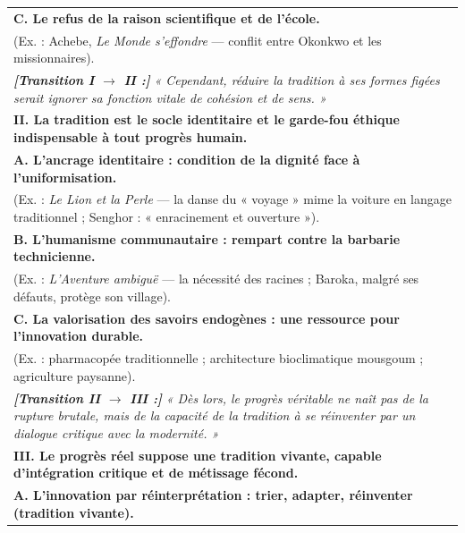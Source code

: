 \documentclass[11pt]{article}
\begin{document}
\begin{exoresolu}
\begin{center}
\begin{tabularx}{\linewidth}{|X|}
\hspace{0.5cm} \textbf{C. Le refus de la raison scientifique et de l'école.} \\
\hspace{1cm} (Ex. : Achebe, \emph{Le Monde s'effondre} — conflit entre Okonkwo et les missionnaires). \\
\hspace{0.5cm} \textit{\textbf{[Transition I $\rightarrow$ II :]}} \emph{« Cependant, réduire la tradition à ses formes figées serait ignorer sa fonction vitale de cohésion et de sens. »} \\ \hline
\textbf{II. La tradition est le socle identitaire et le garde-fou éthique indispensable à tout progrès humain.} \\
\hspace{0.5cm} \textbf{A. L'ancrage identitaire : condition de la dignité face à l'uniformisation.} \\
\hspace{1cm} (Ex. : \emph{Le Lion et la Perle} — la danse du « voyage » mime la voiture en langage traditionnel ; Senghor : « enracinement et ouverture »). \\
\hspace{0.5cm} \textbf{B. L'humanisme communautaire : rempart contre la barbarie technicienne.} \\
\hspace{1cm} (Ex. : \emph{L'Aventure ambiguë} — la nécessité des racines ; Baroka, malgré ses défauts, protège son village). \\
\hspace{0.5cm} \textbf{C. La valorisation des savoirs endogènes : une ressource pour l'innovation durable.} \\
\hspace{1cm} (Ex. : pharmacopée traditionnelle ; architecture bioclimatique mousgoum ; agriculture paysanne). \\
\hspace{0.5cm} \textit{\textbf{[Transition II $\rightarrow$ III :]}} \emph{« Dès lors, le progrès véritable ne naît pas de la rupture brutale, mais de la capacité de la tradition à se réinventer par un dialogue critique avec la modernité. »} \\ \hline
\textbf{III. Le progrès réel suppose une tradition vivante, capable d'intégration critique et de métissage fécond.} \\
\hspace{0.5cm} \textbf{A. L'innovation par réinterprétation : trier, adapter, réinventer (tradition vivante).} \\

\end{tabularx}
\end{center}
\end{exoresolu}
\end{document}

